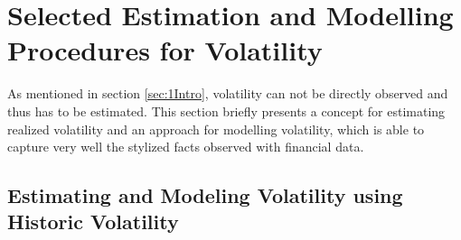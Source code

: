 
\section{Selected Estimation and Modelling Procedures for Volatility}\label{sec:2Models}
As mentioned in section \ref{sec:1Intro}, volatility can not be directly observed and thus has to be estimated. This section briefly presents a concept for estimating realized volatility and an approach for modelling volatility, which is able to capture very well the stylized facts observed with financial data.

\subsection{Estimating and Modeling Volatility using Historic Volatility}\label{sec:22Historic}
%
